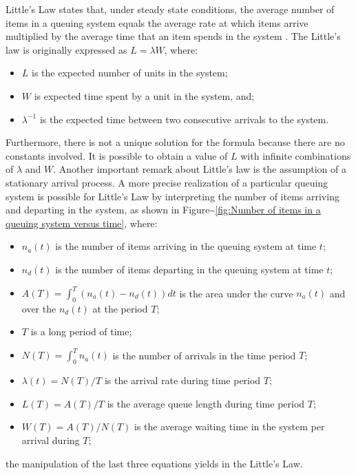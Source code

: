 \documentclass{article}
\begin{document}
Little's Law states that, under steady state conditions, the average number of items in a queuing system equals the average rate at which items arrive multiplied by the average time that an item spends in the system \citep[p. 82]{Little2008}.
The Little's law is originally expressed as \(L=\lambda W\), where:

\begin{itemize}
    \item $L$ is the expected number of units in the system;
    \item $W$ is expected time spent by a unit in the system, and;
    \item $\lambda^{-1}$ is the expected time between two consecutive arrivals to the system.
\end{itemize}

Furthermore, there is not a unique solution for the formula because there are no constants involved.
It is possible to obtain a value of \(L\) with infinite combinations of \(\lambda\) and \(W\).
Another important remark about Little's law is the assumption of a stationary arrival process.
A more precise realization of a particular queuing system is possible for Little's Law by interpreting the number of items arriving and departing in the system, as shown in Figure\textasciitilde{}\ref{fig:Number of items in a queuing system versus time}, where:

\begin{itemize}
    \item $n_a(t)$ is the number of items arriving in the queuing system at time $t$;
    \item $n_d(t)$ is the number of items departing in the queuing system at time $t$;
    \item $A(T)=\int_0^T (n_a(t)-n_d(t))dt$ is the area under the curve $n_a(t)$ and over the $n_d(t)$ at the period $T$;
    \item $T$ is a long period of time;
    \item $N(T)=\int_0^{T}n_a(t)$ is the number of arrivals in the time period $T$;
    \item $\lambda(t)=N(T)/T$ is the arrival rate during time period $T$;
    \item $L(T)=A(T)/T$ is the average queue length during time period $T$;
    \item $W(T)=A(T)/N(T)$ is the average waiting time in the system per arrival during $T$;
\end{itemize}
\nobreak the manipulation of the last three equations yields in the Little's Law.
\end{document}
